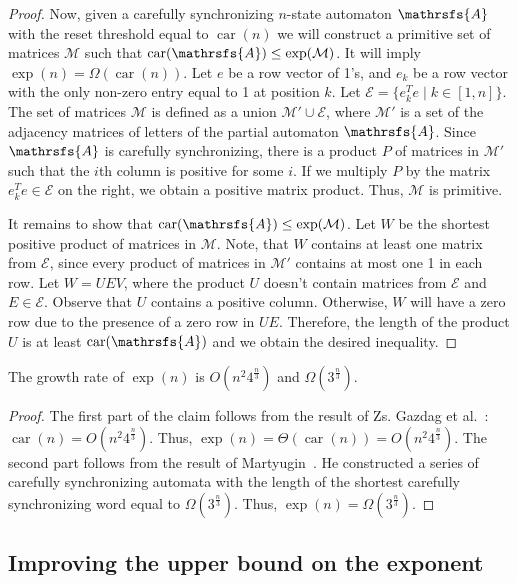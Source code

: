 \documentclass[a4paper,USenglish]{lipics}
\DeclareMathOperator{\car}{car}
\theoremstyle{definition}
\begin{document}
\begin{proof}
Now, given a carefully synchronizing $n$-state automaton $\mathrsfs{A}$ with the reset threshold equal to $\car(n)$ we will construct a primitive set of matrices $\mathcal{M}$ such that $\car(\mathrsfs{A}) \leq \exp(\mathcal{M})$. It will imply $\exp(n) = \Omega (\car (n))$.
Let $e$ be a row vector of 1's, and $e_k$ be a row vector with the only non-zero entry equal to 1 at position $k$. Let $\mathcal{E} = \{e_k^T e \mid k \in [1,n]\}$. The set of matrices $\mathcal{M}$ is defined as a union $\mathcal{M'}\cup\mathcal{E}$, where $\mathcal{M'}$ is a set of the adjacency matrices of letters of the partial automaton $\mathrsfs{A}$. Since $\mathrsfs{A}$ is carefully synchronizing, there is a product $P$ of matrices in $\mathcal{M'}$ such that the $i$th column is positive for some $i$. If we multiply $P$ by the matrix $e_k^T e \in \mathcal{E}$ on the right, we obtain a positive matrix product. Thus, $\mathcal{M}$ is primitive.

It remains to show that $\car(\mathrsfs{A}) \leq \exp(\mathcal{M})$.
Let $W$ be the shortest positive product of matrices in $\mathcal{M}$. Note, that $W$ contains at least one matrix from $\mathcal{E}$, since every product of matrices in $\mathcal{M'}$ contains at most one 1 in each row. Let $W = UEV$, where the product $U$ doesn't contain matrices from $\mathcal{E}$ and $E \in \mathcal{E}$. Observe that $U$ contains a positive column. Otherwise, $W$ will have a zero row due to the presence of a zero row in $UE$. Therefore, the length of the product $U$ is at least $\car(\mathrsfs{A})$ and we obtain the desired inequality.
\end{proof}

\begin{corollary}
\label{corr:simpleBounds}
The growth rate of $\exp(n)$ is $O(n^2 4^{\frac{n}{3}})$ and $\Omega(3^{\frac{n}{3}})$.
\end{corollary}
\begin{proof}
The first part of the claim follows from the result of Zs. Gazdag et al.~\cite[Theorem 3]{Ivan2009}: 
$\car(n) = O(n^2 4^{\frac{n}{3}})$. Thus, $\exp(n) = \Theta(\car(n)) = O(n^2 4^{\frac{n}{3}})$.
The second part follows from the result of Martyugin~\cite{Mart2010}. He constructed a series of carefully synchronizing automata with the length of the shortest carefully synchronizing word equal to $\Omega(3^{\frac{n}{3}})$. Thus, $\exp(n) = \Omega(3^{\frac{n}{3}})$.
\end{proof}


\subsection{Improving the upper bound on the exponent}
\label{sec:imprupper}
\end{document}
